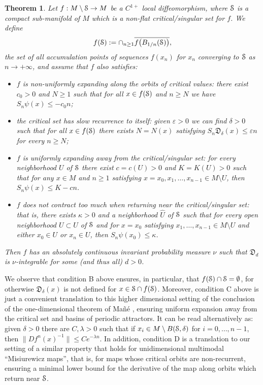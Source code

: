 \documentclass[reqno,12pt,a4paper]{amsart}
\theoremstyle{plain}
\newtheorem{theorem}{Theorem}[section]
\theoremstyle{definition}
\begin{document}
\begin{theorem}
  \label{thm:Misiurew}
  Let $f:M\setminus{\EuScript{S}} \to M$ be a $C^{1+}$ local
  diffeomorphism, where ${\EuScript{S}}$ is a compact sub-manifold of
  $M$ which is a non-flat critical/singular set for $f$.  We
  define
  $$f({\EuScript{S}}):=\cap_{n\ge1}\overline{f\big(B_{1/n}({\EuScript{S}})\big)},$$
  the set of all accumulation points of sequences $f(x_n)$
  for $x_n$ converging to ${\EuScript{S}}$ as $n\to+\infty$, and assume
  that $f$ also satisfies:
  \begin{itemize}
  \item[A:] \emph{$f$ is non-uniformly expanding along the
      orbits of critical values}: there exist $c_0>0$ and
    $N\ge1$ such that for all $x\in f({\EuScript{S}})$ and $n\ge N$ we
    have $S_n\psi(x) \le -c_0 n$;
  \item[B:] \emph{the critical set has slow recurrence to
      itself}: given ${\varepsilon}>0$ we can find $\delta>0$
    such that for all $x\in f({\EuScript{S}})$ there exists $N=N(x)$
    satisfying $S_n{{\mathfrak D}}_\delta(x)\le{\varepsilon} n$ for
        every $n\ge N$;
  \item[C:] \emph{$f$ is uniformly expanding away from the
      critical/singular set}: for every neighborhood $U$ of
    ${\EuScript{S}}$ there exist $c=c(U)>0$ and $K=K(U)>0$
    such that for any $x\in M$ and $n\ge1$ satisfying
      $x=x_0, x_1,\dots, x_{n-1}\in M\setminus U$,
      then $S_n \psi(x) \le K- c n$.
    \item[D:] \emph{$f$ does not contract too much when
        returning near the critical/singular set}: that is,
      there exists $\kappa>0$ and a neighborhood $\hat U$ of
      ${\EuScript{S}}$ such that for every open neighborhood $U\subset
      \hat U$ of ${\EuScript{S}}$ and for $x=x_0$ satisfying $x_1,
      \dots, x_{n-1}\in M\setminus U$ and either
      $x_0\in U$ or $x_n \in  U$, then
      $S_n\psi(x_0)\le\kappa$.
  \end{itemize}
  Then $f$ has an absolutely continuous invariant
  probability measure $\nu$ such that ${{\mathfrak D}}_d$ is
  $\nu$-integrable for some (and thus all) $d>0$.
\end{theorem}

We observe that condition B above ensures, in particular,
that $f({\EuScript{S}})\cap{\EuScript{S}}=\emptyset$, for otherwise
${{\mathfrak D}}_\delta(x)$ is not defined for $x\in{\EuScript{S}}\cap
f({\EuScript{S}})$. Moreover, condition C above is just a convenient
translation to this higher dimensional setting of the
conclusion of the one-dimensional theorem of Ma\~n\'e
\cite{Man85}, ensuring uniform expansion away from the
critical set and basins of periodic attractors. It can be
read alternatively as: given $\delta>0$ there are
$C,\lambda>0$ such that if $x_i\in M\setminus B({\EuScript{S}},\delta)$
for $i=0,\dots,n-1$, then $\|Df^n(x)^{-1}\|\le C e^{-\lambda
  n}$.  In addition, condition D is a translation to our
setting of a similar property that holds for unidimensional
multimodal ``Misiurewicz maps'', that is, for maps whose
critical orbits are non-recurrent, ensuring a minimal lower
bound for the derivative of the map along orbits which
return near ${\EuScript{S}}$.
\end{document}
